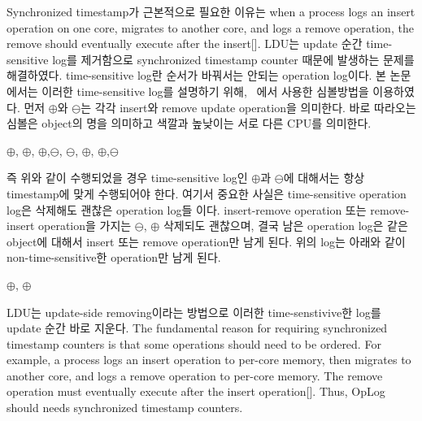 \ifkor
Synchronized timestamp가 근본적으로 필요한 이유는 when a process logs an insert
operation on one core, migrates to another core, and logs a remove operation, the remove should
eventually execute after the insert[].
LDU는 update 순간 time-sensitive log를 제거함으로 synchronized timestamp counter 때문에 발생하는
문제를 해결하였다.
time-sensitive log란 순서가 바꿔서는 안되는 operation log이다. 
본 논문에서는 이러한 time-sensitive log를 설명하기 위해, ~\cite{Clements15SCR}에서 사용한 심볼방법을
이용하였다.
먼저 $\oplus$와 $\ominus$는 각각 insert와 remove update operation을 의미한다.
바로 따라오는 심볼은 object의 명을 의미하고 색깔과 높낮이는 서로 다른 CPU를 의미한다.
\begin{center}
$\oplus$, $\oplus$, $\oplus$,$\ominus$,
$\ominus$, $\oplus$, $\oplus$,$\ominus$
\end{center}
즉 위와 같이 수행되었을 경우 time-sensitive log인 $\oplus$과 $\ominus$에
대해서는 항상 timestamp에 맞게 수행되어야 한다.
여기서 중요한 사실은 time-sensitive operation log은 삭제해도 괜찮은 operation log들 이다.
insert-remove operation 또는 remove-insert operation을 가지는 
$\ominus$, $\oplus$ 삭제되도 괜찮으며, 결국 남은 operation log은 같은
object에 대해서 insert 또는 remove operation만 남게 된다.
위의 log는 아래와 같이 non-time-sensitive한 operation만 남게 된다.
\begin{center}
 $\oplus$, $\oplus$
\end{center}
LDU는 update-side removing이라는 방법으로 이러한 time-senstivive한 log를 update 순간 바로
지운다.
\else
The fundamental reason for requiring synchronized timestamp counters is that 
some operations should need to be ordered.
For example, a process logs an insert operation to per-core memory, then
migrates to another core, and logs a remove operation to per-core memory.
The remove operation must eventually execute after the insert operation[].
Thus, OpLog should needs synchronized timestamp counters.
